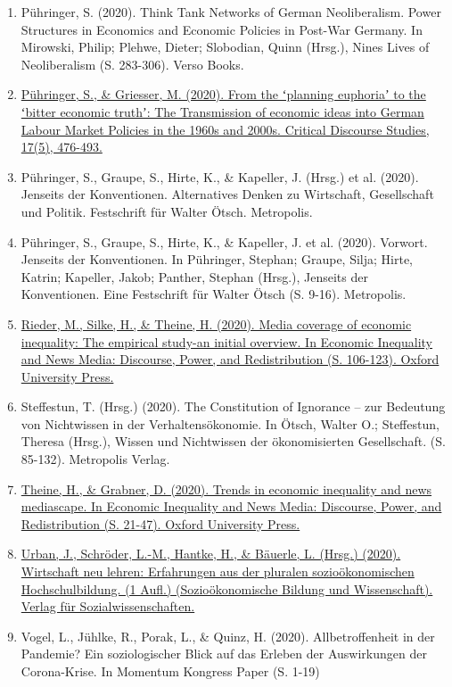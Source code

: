 \begin{enumerate}
	 \item Pühringer, S. (2020). Think Tank Networks of German Neoliberalism. Power Structures in Economics and Economic Policies in Post-War Germany. In Mirowski, Philip; Plehwe, Dieter; Slobodian, Quinn (Hrsg.), Nines Lives of Neoliberalism (S. 283-306). Verso Books.
	 \item \href{https://doi.org/10.1080/17405904.2019.1681283}{Pühringer, S., \& Griesser, M. (2020). From the ʻplanning euphoriaʼ to the ʻbitter economic truthʼ: The Transmission of economic ideas into German Labour Market Policies in the 1960s and 2000s. Critical Discourse Studies, 17(5), 476-493.}
	 \item Pühringer, S., Graupe, S., Hirte, K., \& Kapeller, J. (Hrsg.) et al. (2020). Jenseits der Konventionen. Alternatives Denken zu Wirtschaft, Gesellschaft und Politik. Festschrift für Walter Ötsch. Metropolis.
	 \item Pühringer, S., Graupe, S., Hirte, K., \& Kapeller, J. et al. (2020). Vorwort. Jenseits der Konventionen. In Pühringer, Stephan; Graupe, Silja; Hirte, Katrin; Kapeller, Jakob; Panther, Stephan (Hrsg.), Jenseits der Konventionen. Eine Festschrift für Walter Ötsch (S. 9-16). Metropolis.
	 \item \href{https://doi.org/10.1093/oso/9780190053901.003.0006}{Rieder, M., Silke, H., \& Theine, H. (2020). Media coverage of economic inequality: The empirical study-an initial overview. In Economic Inequality and News Media: Discourse, Power, and Redistribution (S. 106-123). Oxford University Press.}
	 \item Steffestun, T. (Hrsg.) (2020). The Constitution of Ignorance -- zur Bedeutung von Nichtwissen in der Verhaltensökonomie. In Ötsch, Walter O.; Steffestun, Theresa (Hrsg.), Wissen und Nichtwissen der ökonomisierten Gesellschaft. (S. 85-132). Metropolis Verlag.
	 \item \href{https://doi.org/10.1093/oso/9780190053901.003.0002}{Theine, H., \& Grabner, D. (2020). Trends in economic inequality and news mediascape. In Economic Inequality and News Media: Discourse, Power, and Redistribution (S. 21-47). Oxford University Press.}
	 \item \href{https://doi.org/10.1007/978-3-658-30920-6}{Urban, J., Schröder, L.-M., Hantke, H., \& Bäuerle, L. (Hrsg.) (2020). Wirtschaft neu lehren: Erfahrungen aus der pluralen sozioökonomischen Hochschulbildung. (1 Aufl.) (Sozioökonomische Bildung und Wissenschaft). Verlag für Sozialwissenschaften.}
	 \item Vogel, L., Jühlke, R., Porak, L., \& Quinz, H. (2020). Allbetroffenheit in der Pandemie? Ein soziologischer Blick auf das Erleben der Auswirkungen der Corona-Krise. In Momentum Kongress Paper (S. 1-19)

\end{enumerate}
